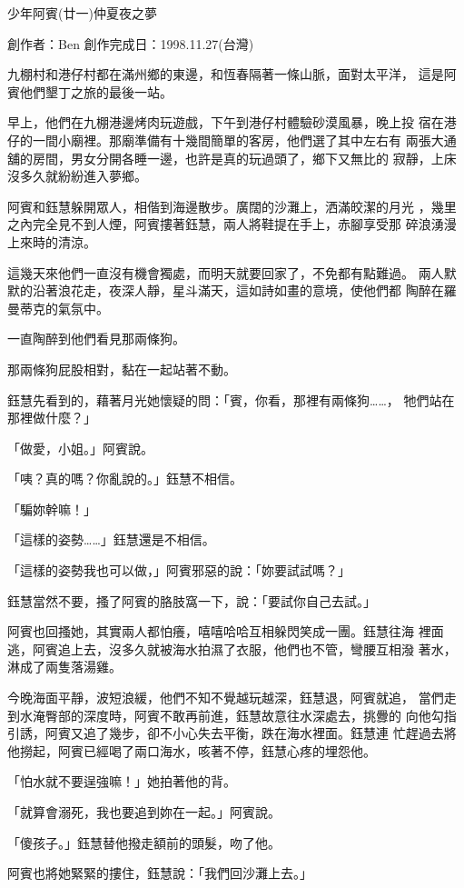 



少年阿賓(廿一)仲夏夜之夢

創作者：Ben
創作完成日：1998.11.27(台灣)


九棚村和港仔村都在滿州鄉的東邊，和恆春隔著一條山脈，面對太平洋，
這是阿賓他們墾丁之旅的最後一站。

早上，他們在九棚港邊烤肉玩遊戲，下午到港仔村體驗砂漠風暴，晚上投
宿在港仔的一間小廟裡。那廟準備有十幾間簡單的客房，他們選了其中左右有
兩張大通舖的房間，男女分開各睡一邊，也許是真的玩過頭了，鄉下又無比的
寂靜，上床沒多久就紛紛進入夢鄉。

阿賓和鈺慧躲開眾人，相偕到海邊散步。廣闊的沙灘上，洒滿皎潔的月光
，幾里之內完全見不到人煙，阿賓摟著鈺慧，兩人將鞋提在手上，赤腳享受那
碎浪湧漫上來時的清涼。

這幾天來他們一直沒有機會獨處，而明天就要回家了，不免都有點難過。
兩人默默的沿著浪花走，夜深人靜，星斗滿天，這如詩如畫的意境，使他們都
陶醉在羅曼蒂克的氣氛中。

一直陶醉到他們看見那兩條狗。

那兩條狗屁股相對，黏在一起站著不動。

鈺慧先看到的，藉著月光她懷疑的問：「賓，你看，那裡有兩條狗……，
牠們站在那裡做什麼？」

「做愛，小姐。」阿賓說。

「咦？真的嗎？你亂說的。」鈺慧不相信。

「騙妳幹嘛！」

「這樣的姿勢……」鈺慧還是不相信。

「這樣的姿勢我也可以做，」阿賓邪惡的說：「妳要試試嗎？」

鈺慧當然不要，搔了阿賓的胳肢窩一下，說：「要試你自己去試。」

阿賓也回搔她，其實兩人都怕癢，嘻嘻哈哈互相躲閃笑成一團。鈺慧往海
裡面逃，阿賓追上去，沒多久就被海水拍濕了衣服，他們也不管，彎腰互相潑
著水，淋成了兩隻落湯雞。

今晚海面平靜，波短浪緩，他們不知不覺越玩越深，鈺慧退，阿賓就追，
當們走到水淹臀部的深度時，阿賓不敢再前進，鈺慧故意往水深處去，挑釁的
向他勾指引誘，阿賓又追了幾步，卻不小心失去平衡，跌在海水裡面。鈺慧連
忙趕過去將他撈起，阿賓已經喝了兩口海水，咳著不停，鈺慧心疼的埋怨他。

「怕水就不要逞強嘛！」她拍著他的背。

「就算會溺死，我也要追到妳在一起。」阿賓說。

「傻孩子。」鈺慧替他撥走額前的頭髮，吻了他。

阿賓也將她緊緊的摟住，鈺慧說：「我們回沙灘上去。」


